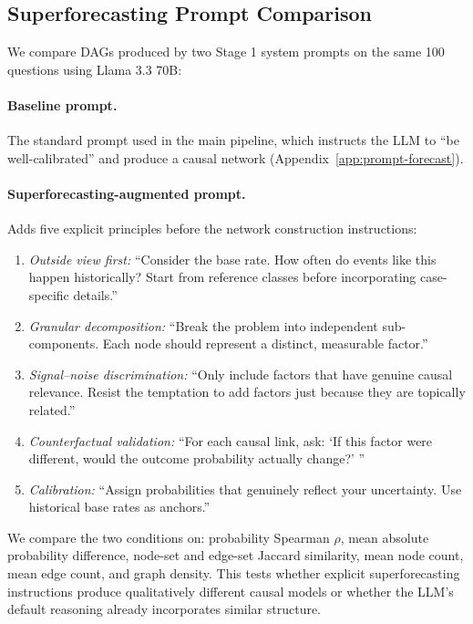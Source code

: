 \documentclass[11pt]{article}
\begin{document}
\subsection{Superforecasting Prompt Comparison}

We compare DAGs produced by two Stage 1 system prompts on the same 100 questions using Llama 3.3 70B:

\paragraph{Baseline prompt.} The standard prompt used in the main pipeline, which instructs the LLM to ``be well-calibrated'' and produce a causal network (Appendix~\ref{app:prompt-forecast}).

\paragraph{Superforecasting-augmented prompt.} Adds five explicit principles before the network construction instructions:
\begin{enumerate}
\small
\item \textit{Outside view first:} ``Consider the base rate. How often do events like this happen historically? Start from reference classes before incorporating case-specific details.''
\item \textit{Granular decomposition:} ``Break the problem into independent sub-components. Each node should represent a distinct, measurable factor.''
\item \textit{Signal--noise discrimination:} ``Only include factors that have genuine causal relevance. Resist the temptation to add factors just because they are topically related.''
\item \textit{Counterfactual validation:} ``For each causal link, ask: `If this factor were different, would the outcome probability actually change?' ''
\item \textit{Calibration:} ``Assign probabilities that genuinely reflect your uncertainty. Use historical base rates as anchors.''
\end{enumerate}

We compare the two conditions on: probability Spearman $\rho$, mean absolute probability difference, node-set and edge-set Jaccard similarity, mean node count, mean edge count, and graph density. This tests whether explicit superforecasting instructions produce qualitatively different causal models or whether the LLM's default reasoning already incorporates similar structure.
\end{document}
